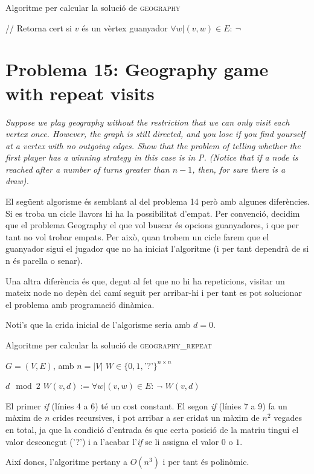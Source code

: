 \documentclass[a4paper]{article}
\begin{document}
\begin{algorithm}[H]
	\caption{Algoritme per calcular la solució de \textsc{geography}}
	\begin{algorithmic}[1]
		\State // Retorna cert si $v$ és un vèrtex guanyador
			\State \Return $\forall w | (v,w) \in E : \ \neg$ 
		\EndFunction
	\end{algorithmic}
\end{algorithm}

\pagebreak
\section{Problema 15: Geography game with repeat visits}
\emph{Suppose we play geography without the restriction that we can only visit each vertex once. However, the graph is still directed, and you lose if you find yourself at a vertex with no outgoing edges. Show that the problem of telling whether the first player has a winning strategy in this case is in P. (Notice that if a node is reached after a number of turns greater than $n − 1$, then, for sure there is a draw).}

El següent algorisme és semblant al del problema 14 però amb algunes diferències. Si es troba un cicle llavors hi ha la possibilitat d'empat. Per convenció, decidim que el problema Geography el que vol buscar és opcions guanyadores, i que per tant no vol trobar empats. Per això, quan trobem un cicle farem que el guanyador sigui el jugador que no ha iniciat l'algoritme (i per tant dependrà de si n és parella o senar).

Una altra diferència és que, degut al fet que no hi ha repeticions, visitar un mateix node no depèn del camí seguit per arribar-hi i per tant es pot solucionar el problema amb programació dinàmica.

Noti's que la crida inicial de l'algorisme seria amb $d=0$.

\begin{algorithm}[H]
	\caption{Algoritme per calcular la solució de \textsc{geography\_repeat}}
	\begin{algorithmic}[1]
		\State $G = (V, E)$, amb $n = |V|$
		\State $W \in \{0,1,$'?'$\}^{n\times n}$

				\State \Return $d \mod 2$
			\EndIf
				\State $W(v,d) := \forall w | (v,w) \in E : \ \neg$ 
			\EndIf
			\State \Return $W(v,d)$
		\EndFunction
	\end{algorithmic}
\end{algorithm}

El primer \emph{if} (línies 4 a 6) té un cost constant. El segon \emph{if} (línies 7 a 9) fa un màxim de $n$ crides recursives, i pot arribar a ser cridat un màxim de $n^2$ vegades en total, ja que la condició d'entrada és que certa posició de la matriu tingui el valor desconegut ('?') i a l'acabar l'\emph{if} se li assigna el valor $0$ o $1$.

Així doncs, l'algoritme pertany a $O(n^3)$ i per tant és polinòmic.
\end{document}

